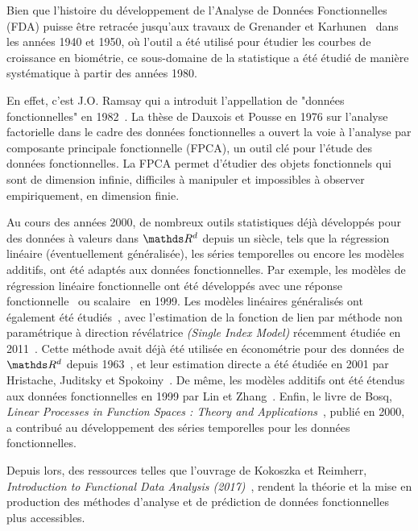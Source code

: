 Bien que l'histoire du développement de l'Analyse de Données Fonctionnelles (FDA) puisse être retracée jusqu'aux travaux de Grenander et Karhunen~\cite{karhunen1946spektraltheorie} dans les années 1940 et 1950, où l'outil a été utilisé pour étudier les courbes de croissance en biométrie, ce sous-domaine de la statistique a été étudié de manière systématique à partir des années 1980.

\smallskip

En effet, c'est J.O. Ramsay qui a introduit l'appellation de "données fonctionnelles" en 1982~\cite{ramsay1982data}. La thèse de Dauxois et Pousse en 1976 sur l'analyse factorielle dans le cadre des données fonctionnelles\cite{dauxois1976analyses} a ouvert la voie à l'analyse par composante principale fonctionnelle (FPCA), un outil clé pour l'étude des données fonctionnelles. La FPCA permet d'étudier des objets fonctionnels qui sont de dimension infinie, difficiles à manipuler et impossibles à observer empiriquement, en dimension finie.

\smallskip

Au cours des années 2000, de nombreux outils statistiques déjà développés pour des données à valeurs dans $\R d$ depuis un siècle, tels que la régression linéaire (éventuellement généralisée), les séries temporelles ou encore les modèles additifs, ont été adaptés aux données fonctionnelles. 
Par exemple, les modèles de régression linéaire fonctionnelle ont été développés avec une réponse fonctionnelle~\cite{ramsay1991some} ou scalaire~\cite{cardot1999functional} en 1999. 
Les modèles linéaires généralisés ont également été étudiés~\cite{james2002generalized,muller2005generalized}, avec l'estimation de la fonction de lien par méthode non paramétrique à direction révélatrice \emph{(Single Index Model)} récemment étudiée en 2011~\cite{chen2011single}. 
Cette méthode avait déjà été utilisée en économétrie pour des données de $\R d$ depuis 1963~\cite{sharpe1963simplified}, et leur estimation directe a été étudiée en 2001 par Hristache, Juditsky et Spokoiny~\cite{hristache2001direct}. De même, les modèles additifs ont été étendus aux données fonctionnelles en 1999 par Lin et Zhang~\cite{lin1999inference}. 
Enfin, le livre de Bosq, \emph{\textcolor{flatuicolors_blue_devil}{Linear Processes in Function Spaces : Theory and Applications}}~\cite{bosq2000linear}, publié en 2000, a contribué au développement des séries temporelles pour les données fonctionnelles.

\smallskip

Depuis lors, des ressources telles que l'ouvrage de Kokoszka et Reimherr, \emph{\textcolor{flatuicolors_blue_devil}{Introduction to Functional Data Analysis (2017)}}~\cite{kokoszka2017introduction}, rendent la théorie et la mise en production des méthodes d'analyse et de prédiction de données fonctionnelles plus accessibles.
